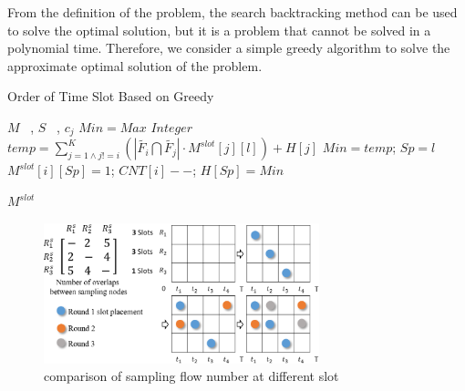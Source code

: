 \documentclass[conference,compsoc]{IEEEtran}
\begin{document}
From the definition of the problem, the search backtracking method can be used to solve the optimal solution, but it is a problem that cannot be solved in a polynomial time. Therefore, we consider a simple greedy algorithm to solve the approximate optimal solution of the problem.
 
\begin{algorithm}[h]
\caption{Order of Time Slot Based on Greedy}
\begin{algorithmic}[1]
\REQUIRE  $M$ ~, $S$ ~, $c_j$
\STATE $Min = Max$ $Integer$
\STATE $temp = \sum^{K}_{j=1 \wedge j != i}(\left| \widetilde{{{F}_{i}}}\bigcap \widetilde{{{F}_{j}}} \right| \cdot M^{slot}[j][l]) + H[j] $
\STATE $Min = temp$; $Sp = l$ 
\ENDIF
\ENDIF
\ENDFOR
\STATE$M^{slot}[i][Sp] = 1$; $ CNT[i]--$; $H[Sp] = Min$
\ENDIF
\ENDFOR
\ENDWHILE

\RETURN $M^{slot}$
\label{code:recentEnd}
\end{algorithmic}
\end{algorithm}

\begin{figure}[!hhhhhhhhhht]
\centering
\includegraphics[width=8cm]{images/greedy_for_order_slot.png}
\caption{comparison of sampling flow number at different slot}
\label{aaa.png}
\end{figure}
\end{document}
